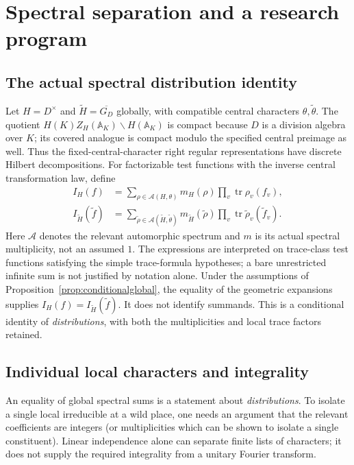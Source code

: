 \documentclass[11pt]{article}
\newcommand{\A}{\mathbb A}
\newcommand{\GDb}{\overline{G_D}}
\theoremstyle{plain}
\theoremstyle{definition}
\begin{document}
\section{Spectral separation and a research program}\label{sec:spectral}
\subsection{The actual spectral distribution identity}
Let $H=D^\times$ and $\widetilde H=\GDb$ globally, with
compatible central characters $\theta,\widetilde\theta$.
The quotient $H(K)Z_H(\A_K)\backslash H(\A_K)$ is compact
because $D$ is a division algebra over $K$; its covered analogue
is compact modulo the specified central preimage as well.
Thus the fixed-central-character right regular representations
have discrete Hilbert decompositions.  For factorizable test
functions with the inverse central transformation law, define
\begin{align}
 I_H(f)&=\sum_{\rho\in\mathcal A(H,\theta)}
       m_H(\rho)\prod_v\operatorname{tr}\rho_v(f_v),\\
 I_{\widetilde H}(\widetilde f)
     &=\sum_{\widetilde\rho\in\mathcal A(\widetilde H,\widetilde\theta)}
       m_{\widetilde H}(\widetilde\rho)
       \prod_v\operatorname{tr}\widetilde\rho_v(\widetilde f_v).
       \label{eq:spectralglobal}
\end{align}
Here $\mathcal A$ denotes the relevant automorphic spectrum
and $m$ is its actual spectral multiplicity, not an assumed $1$.
The expressions are interpreted on trace-class test functions
satisfying the simple trace-formula hypotheses; a bare
unrestricted infinite sum is not justified by notation alone.
Under the assumptions of Proposition~\ref{prop:conditionalglobal},
the equality of the geometric expansions supplies
$I_H(f)=I_{\widetilde H}(\widetilde f)$.  It does not
identify summands.  This is a conditional identity of
\emph{distributions}, with both the multiplicities and local
trace factors retained.

\subsection{Individual local characters and integrality}
An equality of global spectral sums is a statement about
\emph{distributions}.  To isolate a single local irreducible at a
wild place, one needs an argument that the relevant coefficients
are integers (or multiplicities which can be shown to isolate a
single constituent).  Linear independence alone can separate
finite lists of characters; it does not supply the required
integrality from a unitary Fourier transform.
\end{document}
